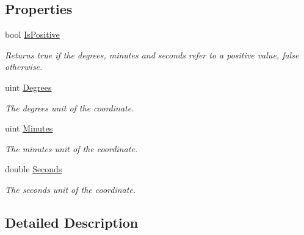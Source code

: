 \subsection*{Properties}
\begin{DoxyCompactItemize}
\item 
bool \hyperlink{class_g_p_s_mobile_1_1_degrees_minutes_seconds_a14812fc58ea812f0a28b20447f2e32cc}{IsPositive}
\begin{DoxyCompactList}\small\item\em Returns true if the degrees, minutes and seconds refer to a positive value, false otherwise. \item\end{DoxyCompactList}\item 
uint \hyperlink{class_g_p_s_mobile_1_1_degrees_minutes_seconds_ae24ec91d5cae1b7bb197b8a9ce319965}{Degrees}
\begin{DoxyCompactList}\small\item\em The degrees unit of the coordinate. \item\end{DoxyCompactList}\item 
uint \hyperlink{class_g_p_s_mobile_1_1_degrees_minutes_seconds_a186a923e69d06147fa4682300c47ae71}{Minutes}
\begin{DoxyCompactList}\small\item\em The minutes unit of the coordinate. \item\end{DoxyCompactList}\item 
double \hyperlink{class_g_p_s_mobile_1_1_degrees_minutes_seconds_aba3b082a41209eaffe829426d760bc5a}{Seconds}
\begin{DoxyCompactList}\small\item\em The seconds unit of the coordinate. \item\end{DoxyCompactList}\end{DoxyCompactItemize}


\subsection{Detailed Description}


